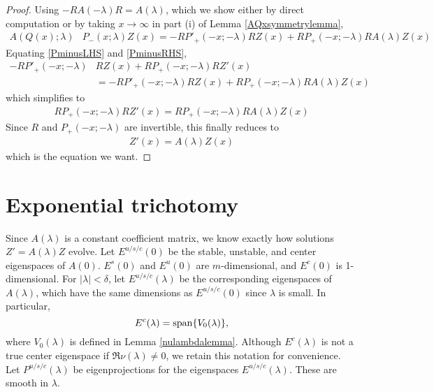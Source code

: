 \documentclass[thesis.tex]{subfiles}
\begin{document}
\begin{lemma}
\begin{proof}
Using $-R A(-\lambda) R = A(\lambda)$, which we show either by direct computation or by taking $x \rightarrow \infty$ in part (i) of Lemma \ref{AQxsymmetrylemma},
\begin{align}\label{PminusRHS}
A(Q(x); \lambda)&P_-(x; \lambda) Z(x) =  -R P'_+(-x; -\lambda) R Z(x) + R P_+(-x; -\lambda) R A(\lambda) Z(x)
\end{align}
Equating \cref{PminusLHS} and \cref{PminusRHS},
\begin{align*}
-RP'_+(-x; -\lambda)&R Z(x) + RP_+(-x; -\lambda)R Z'(x) \\
&= -R P'_+(-x; -\lambda) R Z(x) + R P_+(-x; -\lambda) R A(\lambda) Z(x)
\end{align*}
which simplifies to
\begin{align*}
RP_+(-x; -\lambda)R Z'(x) = R P_+(-x; -\lambda) R A(\lambda) Z(x)
\end{align*}
Since $R$ and $P_+(-x; -\lambda)$ are invertible, this finally reduces to 
\begin{align*}
Z'(x) = A(\lambda) Z(x)
\end{align*}
which is the equation we want.
\end{proof}
\end{lemma}

\section{Exponential trichotomy}\label{sec:trichotomy}

Since $A(\lambda)$ is a constant coefficient matrix, we know exactly how solutions $Z' = A(\lambda)Z$ evolve. Let $E^{u/s/c}(0)$ be the stable, unstable, and center eigenspaces of $A(0)$. $E^s(0)$ and $E^u(0)$ are $m$-dimensional, and $E^c(0)$ is 1-dimensional. For $|\lambda| < \delta$, let $E^{u/s/c}(\lambda)$ be the corresponding eigenspaces of $A(\lambda)$, which have the same dimensions as $E^{u/s/c}(0)$ since $\lambda$ is small. In particular, 
\[
E^c(\lambda) = \operatorname{span}\{ V_0(\lambda) \},
\]
where $V_0(\lambda)$ is defined in Lemma \ref{nulambdalemma}. Although $E^c(\lambda)$ is not a true center eigenspace if $\Re \nu(\lambda) \neq 0$, we retain this notation for convenience. Let $P^{u/s/c}(\lambda)$ be eigenprojections for the eigenspaces $E^{u/s/c}(\lambda)$. These are smooth in $\lambda$. 
\end{document}
